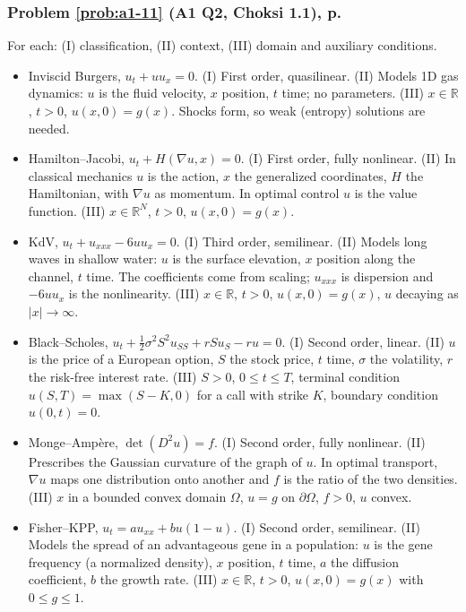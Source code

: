 \documentclass{article}
\newcommand{\R}{\mathbb{R}}
\begin{document}
\subsubsection*{Problem \ref{prob:a1-11} (A1 Q2, Choksi 1.1), p.~\pageref{prob:a1-11}}
For each: (I) classification, (II) context, (III) domain and auxiliary conditions.
\begin{itemize}
    \item[(b)] Inviscid Burgers, $u_t + uu_x = 0$. (I) First order, quasilinear. (II) Models 1D gas dynamics: $u$ is the fluid velocity, $x$ position, $t$ time; no parameters. (III) $x \in \R$, $t > 0$, $u(x,0) = g(x)$. Shocks form, so weak (entropy) solutions are needed.
    \item[(d)] Hamilton--Jacobi, $u_t + H(\nabla u, x) = 0$. (I) First order, fully nonlinear. (II) In classical mechanics $u$ is the action, $x$ the generalized coordinates, $H$ the Hamiltonian, with $\nabla u$ as momentum. In optimal control $u$ is the value function. (III) $x \in \R^N$, $t > 0$, $u(x,0) = g(x)$.
    \item[(e)] KdV, $u_t + u_{xxx} - 6uu_x = 0$. (I) Third order, semilinear. (II) Models long waves in shallow water: $u$ is the surface elevation, $x$ position along the channel, $t$ time. The coefficients come from scaling; $u_{xxx}$ is dispersion and $-6uu_x$ is the nonlinearity. (III) $x \in \R$, $t > 0$, $u(x,0) = g(x)$, $u$ decaying as $|x| \to \infty$.
    \item[(i)] Black--Scholes, $u_t + \frac12\sigma^2S^2u_{SS} + rSu_S - ru = 0$. (I) Second order, linear. (II) $u$ is the price of a European option, $S$ the stock price, $t$ time, $\sigma$ the volatility, $r$ the risk-free interest rate. (III) $S > 0$, $0 \leq t \leq T$, terminal condition $u(S,T) = \max(S - K, 0)$ for a call with strike $K$, boundary condition $u(0,t) = 0$.
    \item[(j)] Monge--Amp\`ere, $\det(D^2u) = f$. (I) Second order, fully nonlinear. (II) Prescribes the Gaussian curvature of the graph of $u$. In optimal transport, $\nabla u$ maps one distribution onto another and $f$ is the ratio of the two densities. (III) $x$ in a bounded convex domain $\Omega$, $u = g$ on $\partial\Omega$, $f > 0$, $u$ convex.
    \item[(o)] Fisher--KPP, $u_t = au_{xx} + bu(1-u)$. (I) Second order, semilinear. (II) Models the spread of an advantageous gene in a population: $u$ is the gene frequency (a normalized density), $x$ position, $t$ time, $a$ the diffusion coefficient, $b$ the growth rate. (III) $x \in \R$, $t > 0$, $u(x,0) = g(x)$ with $0 \leq g \leq 1$.
\end{itemize}
\end{document}
